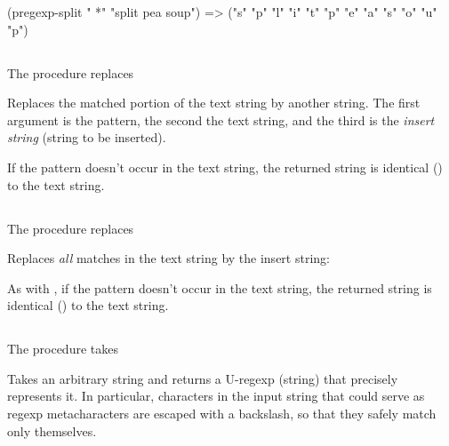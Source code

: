 {{(pregexp-split " *" "split pea     soup")
=> ("s" "p" "l" "i" "t" "p" "e" "a" "s" "o" "u" "p")
}

\subsection{}

\ifx\MzLibManual\Undefined
The procedure  replaces
\else


Replaces
\fi
the
matched portion of the text string by another
string.  The first argument is the pattern,
the second the text string, and the third
is the {\em insert string} (string to be inserted).


\n If the pattern doesn't occur in the text
string, the returned string is identical ()
to the text string.

\subsection{}

\ifx\MzLibManual\Undefined
The procedure  replaces
\else
{}

Replaces
\fi
{\em all}
matches in the text string by the insert
string:


\n As with , if the pattern doesn't
occur in the text string, the returned string is
identical () to the text string.

\subsection{}

\ifx\MzLibManual\Undefined
The procedure  takes
\else
{}

Takes \fi an arbitrary string and returns a U-regexp
(string) that precisely represents it.  In particular,
characters in the input string that could serve as
regexp metacharacters are escaped with a
backslash, so that they safely match only themselves.

}
